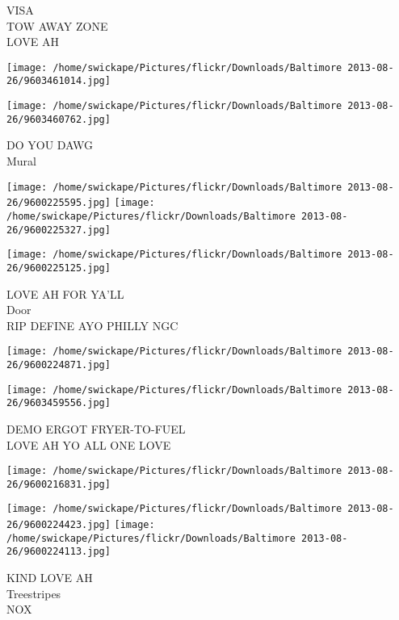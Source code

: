 \documentclass[10pt,letterpaper]{article}
\begin{document}
VISA\\
TOW AWAY ZONE\\
LOVE AH\\
\pagebreak

\texttt{[image: /home/swickape/Pictures/flickr/Downloads/Baltimore 2013-08-26/9603461014.jpg]}

\vspace{0.25in}
\texttt{[image: /home/swickape/Pictures/flickr/Downloads/Baltimore 2013-08-26/9603460762.jpg]}

DO YOU DAWG\\
Mural\\
\pagebreak

\texttt{[image: /home/swickape/Pictures/flickr/Downloads/Baltimore 2013-08-26/9600225595.jpg]}
\texttt{[image: /home/swickape/Pictures/flickr/Downloads/Baltimore 2013-08-26/9600225327.jpg]}

\vspace{0.25in}
\texttt{[image: /home/swickape/Pictures/flickr/Downloads/Baltimore 2013-08-26/9600225125.jpg]}

LOVE AH FOR YA'LL\\
Door\\
RIP DEFINE AYO PHILLY NGC\\
\pagebreak

\texttt{[image: /home/swickape/Pictures/flickr/Downloads/Baltimore 2013-08-26/9600224871.jpg]}

\vspace{0.25in}
\texttt{[image: /home/swickape/Pictures/flickr/Downloads/Baltimore 2013-08-26/9603459556.jpg]}

DEMO ERGOT FRYER{-}TO{-}FUEL\\
LOVE AH YO ALL ONE LOVE\\
\pagebreak

\texttt{[image: /home/swickape/Pictures/flickr/Downloads/Baltimore 2013-08-26/9600216831.jpg]}

\vspace{0.25in}
\texttt{[image: /home/swickape/Pictures/flickr/Downloads/Baltimore 2013-08-26/9600224423.jpg]}
\texttt{[image: /home/swickape/Pictures/flickr/Downloads/Baltimore 2013-08-26/9600224113.jpg]}

KIND LOVE AH\\
Treestripes\\
NOX\\
\pagebreak
\end{document}
